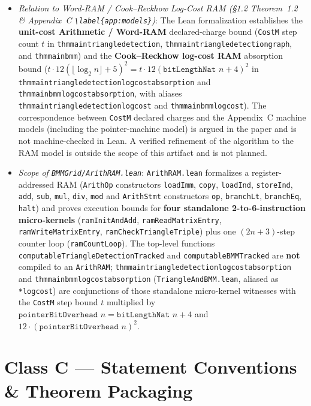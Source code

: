 \documentclass[10pt,letterpaper]{article}
\renewcommand{\_}{\origunderscore\allowbreak}
\newcommand{\code}[1]{\texttt{#1}}
\begin{document}
\begin{itemize}
  \item \emph{Relation to Word-RAM / Cook--Reckhow Log-Cost RAM (\S 1.2 Theorem~1.2 \& Appendix~C \code{\textbackslash label\{app:models\}})}:
  The Lean formalization establishes the \textbf{unit-cost Arithmetic / Word-RAM} declared-charge bound (\code{CostM} step count $t$ in \code{thm\_main\_triangle\_detection}, \code{thm\_main\_triangle\_detection\_graph}, and \code{thm\_main\_bmm}) and the \textbf{Cook--Reckhow log-cost RAM} absorption bound ($t \cdot 12(\lfloor \log_2 n \rfloor + 5)^2 = t \cdot 12(\code{bitLengthNat }n + 4)^2$ in \code{thm\_main\_triangle\_detection\_log\_cost\_absorption} and \code{thm\_main\_bmm\_log\_cost\_absorption}, with aliases \code{thm\_main\_triangle\_detection\_log\_cost} and \code{thm\_main\_bmm\_log\_cost}). The correspondence between \code{CostM} declared charges and the Appendix~C machine models (including the pointer-machine model) is argued in the paper and is not machine-checked in Lean. A verified refinement of the algorithm to the RAM model is outside the scope of this artifact and is not planned.
  \item \emph{Scope of \code{BMMGrid/ArithRAM.lean}}:
  \code{ArithRAM.lean} formalizes a register-addressed RAM (\code{ArithOp} constructors \code{loadImm}, \code{copy}, \code{loadInd}, \code{storeInd}, \code{add}, \code{sub}, \code{mul}, \code{div}, \code{mod} and \code{ArithStmt} constructors \code{op}, \code{branchLt}, \code{branchEq}, \code{halt}) and proves execution bounds for \textbf{four standalone 2-to-6-instruction micro-kernels} (\code{ramInitAndAdd}, \code{ramReadMatrixEntry}, \code{ramWriteMatrixEntry}, \code{ramCheckTriangleTriple}) plus one $(2n+3)$-step counter loop (\code{ramCountLoop}). The top-level functions \code{computableTriangleDetectionTracked} and \code{computableBMMTracked} are \textbf{not} compiled to an \code{ArithRAM}; \code{thm\_main\_triangle\_detection\_log\_cost\_absorption} and \code{thm\_main\_bmm\_log\_cost\_absorption} (\code{TriangleAndBMM.lean}, aliased as \code{*\_log\_cost}) are conjunctions of those standalone micro-kernel witnesses with the \code{CostM} step bound $t$ multiplied by $\code{pointerBitOverhead }n = \code{bitLengthNat }n + 4$ and $12 \cdot (\code{pointerBitOverhead }n)^2$.
\end{itemize}

\section{\texorpdfstring{Class C --- Statement Conventions \& Theorem Packaging}{Class C - Statement Conventions and Theorem Packaging}}
\label{sec:class-c}
\end{document}
